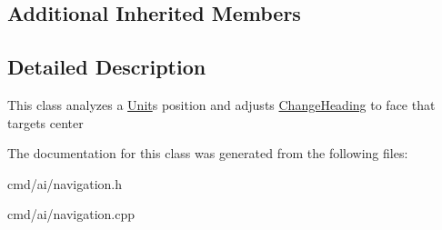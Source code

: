 \subsection*{Additional Inherited Members}


\subsection{Detailed Description}
This class analyzes a \hyperlink{classUnit}{Unit}\textquotesingle{}s position and adjusts \hyperlink{classOrders_1_1ChangeHeading}{Change\+Heading} to face that target\textquotesingle{}s center 

The documentation for this class was generated from the following files\+:\begin{DoxyCompactItemize}
\item 
cmd/ai/navigation.\+h\item 
cmd/ai/navigation.\+cpp\end{DoxyCompactItemize}
